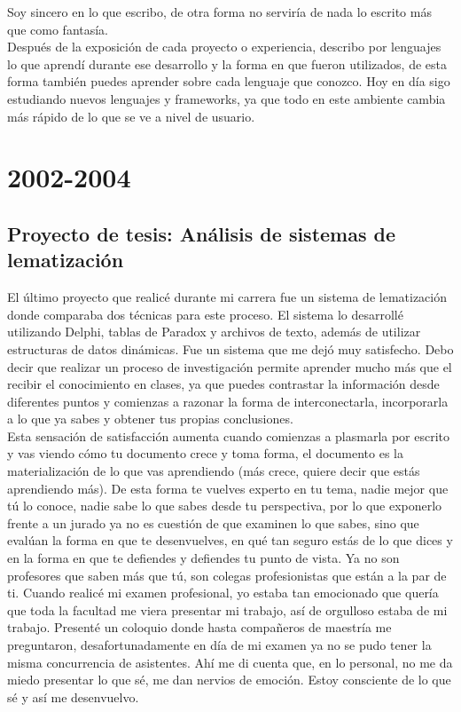 \documentclass[12pt,spanish,lettersize]{book}
\begin{document}
Soy sincero en lo que escribo, de otra forma no serviría de nada lo escrito más que como fantasía.\\

Después de la exposición de cada proyecto o experiencia, describo por lenguajes lo que aprendí durante ese desarrollo y la forma en que fueron utilizados, de esta forma también puedes aprender sobre cada lenguaje que conozco. Hoy en día sigo estudiando nuevos lenguajes y frameworks, ya que todo en este ambiente cambia más rápido de lo que se ve a nivel de usuario.

\chapter{2002-2004}

\section{Proyecto de tesis: Análisis de sistemas de lematización}
El último proyecto que realicé durante mi carrera fue un sistema de lematización donde comparaba dos técnicas para este proceso. El sistema lo desarrollé utilizando Delphi, tablas de Paradox y archivos de texto, además de utilizar estructuras de datos dinámicas. Fue un sistema que me dejó muy satisfecho. Debo decir que realizar un proceso de investigación permite aprender mucho más que el recibir el conocimiento en clases, ya que puedes contrastar la información desde diferentes puntos y comienzas a razonar la forma de interconectarla, incorporarla a lo que ya sabes y obtener tus propias conclusiones.\\

Esta sensación de satisfacción aumenta cuando comienzas a plasmarla por escrito y vas viendo cómo tu documento crece y toma forma, el documento es la materialización de lo que vas aprendiendo (más crece, quiere decir que estás aprendiendo más). De esta forma te vuelves experto en tu tema, nadie mejor que tú lo conoce, nadie sabe lo que sabes desde tu perspectiva, por lo que exponerlo frente a un jurado ya no es cuestión de que examinen lo que sabes, sino que evalúan la forma en que te desenvuelves, en qué tan seguro estás de lo que dices y en la forma en que te defiendes y defiendes tu punto de vista. Ya no son profesores que saben más que tú, son colegas profesionistas que están a la par de ti. Cuando realicé mi examen profesional, yo estaba tan emocionado que quería que toda la facultad me viera presentar mi trabajo, así de orgulloso estaba de mi trabajo. Presenté un coloquio donde hasta compañeros de maestría me preguntaron, desafortunadamente en día de mi examen ya no se pudo tener la misma concurrencia de asistentes. Ahí me di cuenta que, en lo personal, no me da miedo presentar lo que sé, me dan nervios de emoción. Estoy consciente de lo que sé y así me desenvuelvo.\\
\end{document}
